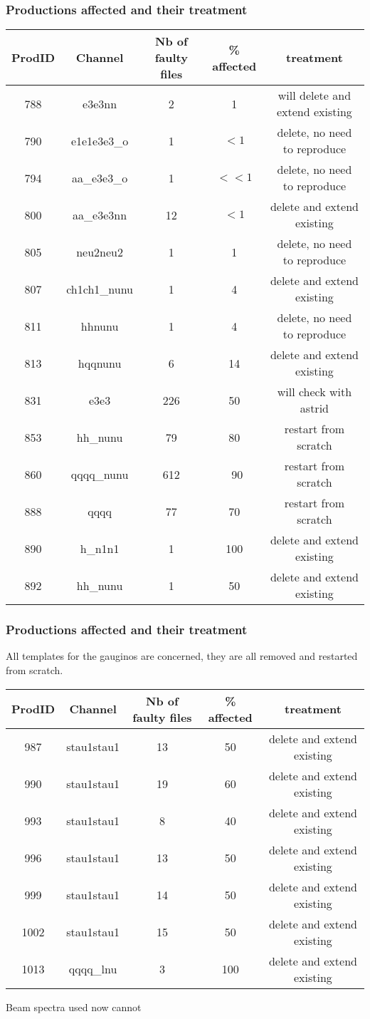 \documentclass{beamer}
\begin{document}
\begin{frame}
\frametitle{Productions affected and their treatment}
\begin{center}
{\scriptsize 
\begin{tabular}{ccccc}
    \toprule
ProdID & Channel & Nb of faulty files & \% affected & treatment \\
\midrule
788 & e3e3nn & 2 & 1 & will delete and extend existing\\
790 & e1e1e3e3\_o & 1  & $<1$ & delete, no need to reproduce\\
794 & aa\_e3e3\_o  & 1 &$<<1$& delete, no need to reproduce\\
800& aa\_e3e3nn & 12 & $<1$ & delete and extend existing\\
805& neu2neu2 & 1 & 1 & delete, no need to reproduce\\
807& ch1ch1\_nunu & 1 & 4 & delete and extend existing\\
811& hhnunu & 1 & 4 & delete, no need to reproduce\\
813& hqqnunu & 6 & 14 & delete and extend existing \\
831& e3e3 & 226 & 50 & will check with astrid \\
853& hh\_nunu & 79 & 80 & restart from scratch\\
860& qqqq\_nunu & 612 &~90& restart from scratch\\
888& qqqq & 77 & 70 & restart from scratch\\
890& h\_n1n1 & 1 & 100 & delete and extend existing\\
892& hh\_nunu & 1 & 50 & delete and extend existing\\
    \bottomrule
\end{tabular}
}
\end{center}
\end{frame}

\begin{frame}
\frametitle{Productions affected and their treatment}
All templates for the gauginos are concerned, they are all removed and restarted
from scratch.
\begin{center}
{\scriptsize 
\begin{tabular}{ccccc}
    \toprule
ProdID & Channel & Nb of faulty files & \% affected & treatment \\
\midrule
987 & stau1stau1 & 13  & 50 &  delete and extend existing\\
990 & stau1stau1 & 19  & 60 &  delete and extend existing\\
993 & stau1stau1 & 8 & 40 &  delete and extend existing\\
996 & stau1stau1 & 13 & 50 &  delete and extend existing\\
999 & stau1stau1 & 14  & 50 &  delete and extend existing\\
1002 & stau1stau1 & 15 & 50 &  delete and extend existing\\
1013 & qqqq\_lnu & 3  & 100 & delete and extend existing\\
     \bottomrule
\end{tabular}
}
\end{center}

Beam spectra used now cannot 

\end{frame}
\end{document}

